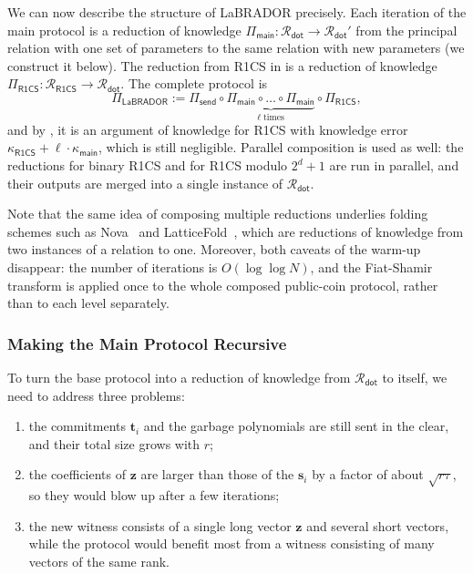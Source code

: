 \documentclass[../../book.tex]{subfiles}
\begin{document}
We can now describe the structure of LaBRADOR precisely.
Each iteration of the main protocol is a reduction of knowledge
$\Pi_{\mathsf{main}}: \mathcal{R}_{\mathsf{dot}} \to \mathcal{R}_{\mathsf{dot}}'$
from the principal relation with one set of parameters to the same relation with new parameters (we construct it below).
The reduction from R1CS in  is a reduction of knowledge $\Pi_{\mathsf{R1CS}}: \mathcal{R}_{\mathsf{R1CS}} \to \mathcal{R}_{\mathsf{dot}}$.
The complete protocol is
\begin{equation*}
    \Pi_{\mathsf{LaBRADOR}} := \Pi_{\mathsf{send}} \circ \underbrace{\Pi_{\mathsf{main}} \circ \dots \circ \Pi_{\mathsf{main}}}_{\ell \; \text{times}} \circ \Pi_{\mathsf{R1CS}},
\end{equation*}
and by , it is an argument of knowledge for R1CS with knowledge error $\kappa_{\mathsf{R1CS}} + \ell \cdot \kappa_{\mathsf{main}}$, which is still negligible.
Parallel composition is used as well: the reductions for binary R1CS and for R1CS modulo $2^d+1$ are run in parallel, and their outputs are merged into a single instance of $\mathcal{R}_{\mathsf{dot}}$.

Note that the same idea of composing multiple reductions underlies folding schemes such as Nova~\cite{C:KotSetTzi22} and LatticeFold~\cite{EPRINT:BonChe24}, which are reductions of knowledge from two instances of a relation to one.
Moreover, both caveats of the warm-up disappear: the number of iterations is $O(\log\log N)$, and the Fiat-Shamir transform is applied once to the whole composed public-coin protocol, rather than to each level separately.

\subsubsection{Making the Main Protocol Recursive}

To turn the base protocol into a reduction of knowledge from $\mathcal{R}_{\mathsf{dot}}$ to itself, we need to address three problems:
\begin{enumerate}
    \item[\textit{Issue \#1}] the commitments $\mathbf{t}_i$ and the garbage polynomials are still sent in the clear, and their total size grows with $r$;
    \item[\textit{Issue \#2}] the coefficients of $\mathbf{z}$ are larger than those of the $\mathbf{s}_i$ by a factor of about $\sqrt{r\tau}$, so they would blow up after a few iterations;
    \item[\textit{Issue \#3}] the new witness consists of a single long vector $\mathbf{z}$ and several short vectors, while the protocol would benefit most from a witness consisting of many vectors of the same rank.
\end{enumerate}
\end{document}

